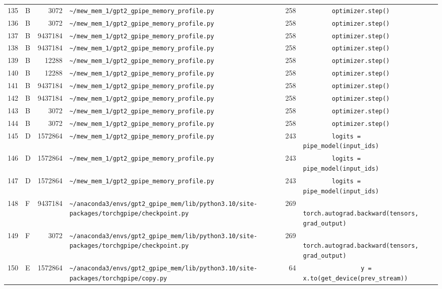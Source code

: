 \documentclass{article}
\begin{document}
\begin{longtable}{r l r p{6.5cm} r p{7.0cm}}
135 & B & 3072 & \lstinline|~/mew_mem_1/gpt2_gpipe_memory_profile.py| & 258 & \lstinline|        optimizer.step()| \\
136 & B & 3072 & \lstinline|~/mew_mem_1/gpt2_gpipe_memory_profile.py| & 258 & \lstinline|        optimizer.step()| \\
137 & B & 9437184 & \lstinline|~/mew_mem_1/gpt2_gpipe_memory_profile.py| & 258 & \lstinline|        optimizer.step()| \\
138 & B & 9437184 & \lstinline|~/mew_mem_1/gpt2_gpipe_memory_profile.py| & 258 & \lstinline|        optimizer.step()| \\
139 & B & 12288 & \lstinline|~/mew_mem_1/gpt2_gpipe_memory_profile.py| & 258 & \lstinline|        optimizer.step()| \\
140 & B & 12288 & \lstinline|~/mew_mem_1/gpt2_gpipe_memory_profile.py| & 258 & \lstinline|        optimizer.step()| \\
141 & B & 9437184 & \lstinline|~/mew_mem_1/gpt2_gpipe_memory_profile.py| & 258 & \lstinline|        optimizer.step()| \\
142 & B & 9437184 & \lstinline|~/mew_mem_1/gpt2_gpipe_memory_profile.py| & 258 & \lstinline|        optimizer.step()| \\
143 & B & 3072 & \lstinline|~/mew_mem_1/gpt2_gpipe_memory_profile.py| & 258 & \lstinline|        optimizer.step()| \\
144 & B & 3072 & \lstinline|~/mew_mem_1/gpt2_gpipe_memory_profile.py| & 258 & \lstinline|        optimizer.step()| \\
145 & D & 1572864 & \lstinline|~/mew_mem_1/gpt2_gpipe_memory_profile.py| & 243 & \lstinline|        logits = pipe_model(input_ids)| \\
146 & D & 1572864 & \lstinline|~/mew_mem_1/gpt2_gpipe_memory_profile.py| & 243 & \lstinline|        logits = pipe_model(input_ids)| \\
147 & D & 1572864 & \lstinline|~/mew_mem_1/gpt2_gpipe_memory_profile.py| & 243 & \lstinline|        logits = pipe_model(input_ids)| \\
148 & F & 9437184 & \lstinline|~/anaconda3/envs/gpt2_gpipe_mem/lib/python3.10/site-packages/torchgpipe/checkpoint.py| & 269 & \lstinline|            torch.autograd.backward(tensors, grad_output)| \\
149 & F & 3072 & \lstinline|~/anaconda3/envs/gpt2_gpipe_mem/lib/python3.10/site-packages/torchgpipe/checkpoint.py| & 269 & \lstinline|            torch.autograd.backward(tensors, grad_output)| \\
150 & E & 1572864 & \lstinline|~/anaconda3/envs/gpt2_gpipe_mem/lib/python3.10/site-packages/torchgpipe/copy.py| & 64 & \lstinline|                y = x.to(get_device(prev_stream))| \\

\end{longtable}
\end{document}
